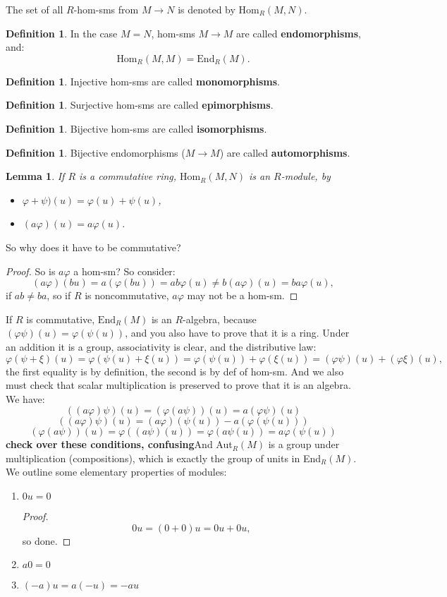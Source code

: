 \documentclass[12pt]{amsbook}
\theoremstyle{plain}
\numberwithin{section}{chapter}
\numberwithin{equation}{chapter}
\newtheorem{lem}[theorem]{Lemma}
\theoremstyle{definition}
\newtheorem{Def}[theorem]{Definition}
\theoremstyle{remark}
\renewcommand{\phi}{\varphi}
\begin{document}
The set of all $R$-hom-sms from $M\to N$ is denoted by $\text{Hom}_R(M,N)$. 
\begin{Def}In the case $M = N$, hom-sms $M \to M$ are called \textbf{endomorphisms}, and:
$$
\text{Hom}_R(M,M) = \text{End}_R(M). 
$$
\end{Def}
\begin{Def}
Injective hom-sms are called \textbf{monomorphisms}. 
\end{Def}

\begin{Def}
Surjective hom-sms are called \textbf{epimorphisms}. 
\end{Def}

\begin{Def}
Bijective hom-sms are called \textbf{isomorphisms}. 
\end{Def}

\begin{Def}
Bijective endomorphisms ($M \to M$) are called \textbf{automorphisms}. 
\end{Def}

\begin{lem}
If $R$ is a commutative ring, $\text{Hom}_R(M,N)$ is an $R$-module, by 
\begin{itemize}
\item $\phi + \psi)(u) = \phi(u) + \psi(u)$,
\item $(a\phi)(u) = a\phi(u)$.
\end{itemize}
\end{lem}
So why does it have to be commutative?
\begin{proof}
So is $a\phi$ a hom-sm? So consider:
$$
(a\phi)(bu) = a(\phi(bu)) = ab\phi(u) \neq b(a\phi)(u) = ba\phi(u),
$$
if $ab \neq ba$, so if $R$ is noncommutative, $a\phi$ may not be a hom-sm. 
\end{proof}
If $R$ is commutative, $\text{End}_R(M)$ is an $R$-algebra, because $(\phi\psi)(u) = \phi(\psi(u))$, and you also have to prove that it is a ring. Under an addition it is a group, associativity is clear, and the distributive law:
$$
\phi(\psi + \xi)(u) = \phi(\psi(u) + \xi(u)) = \phi(\psi(u)) + \phi(\xi(u)) = (\phi\psi)(u) + (\phi\xi)(u),
$$
the first equality is by definition, the second is by def of hom-sm. And we also must check that scalar multiplication is preserved to prove that it is an algebra. We have:
$$
((a\phi)\psi)(u) = (\phi(a\psi))(u) = a(\phi\psi)(u)
$$
$$
((a\phi)\psi)(u) = (a\phi)(\psi(u)) - a(\phi(\psi(u)))
$$
$$
(\phi(a\psi))(u) = \phi((a\psi)(u)) = \phi(a\psi(u)) = a\phi(\psi(u))
$$
\textbf{check over these conditions, confusing}And Aut$_R(M)$ is a group under multiplication (compositions), which is exactly the group of units in End$_R(M)$. 
\vspace{3mm}
We outline some elementary properties of modules:
\begin{enumerate}
\item $0u = 0$
\begin{proof}
$$
0u = (0 + 0)u = 0u + 0u,
$$
so done. 
\end{proof}
\item $a0 = 0$
\item $(-a)u= a(-u) = -au$
\end{enumerate}
\end{document}
